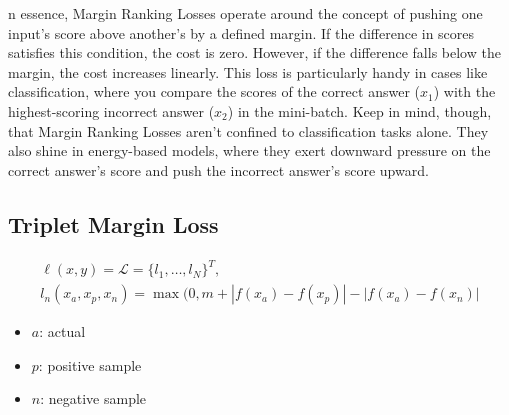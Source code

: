 \documentclass[11pt]{article}
\begin{document}
n essence, Margin Ranking Losses operate around the concept of pushing one input's score above another's by a defined margin. If the difference in scores satisfies this condition, the cost is zero. However, if the difference falls below the margin, the cost increases linearly. This loss is particularly handy in cases like classification, where you compare the scores of the correct answer ($x_1$) with the highest-scoring incorrect answer ($x_2$) in the mini-batch. Keep in mind, though, that Margin Ranking Losses aren't confined to classification tasks alone. They also shine in energy-based models, where they exert downward pressure on the correct answer's score and push the incorrect answer's score upward.

\subsection{Triplet Margin Loss}

\begin{definition}\label{eq:triplet-margin-loss}
    \begin{align*}
        \ell (x,y) = \mathcal{L} = \{l_1,\ldots,l_N\}^T, \\
        l_n(x_a, x_p, x_n) = \max(0, m + |f(x_a) - f(x_p)| - | f(x_a) - f(x_n)|
    \end{align*}

    \begin{itemize}
        \item $a$: actual
        \item $p$: positive sample
        \item $n$: negative sample
    \end{itemize}
\end{definition}
\end{document}
